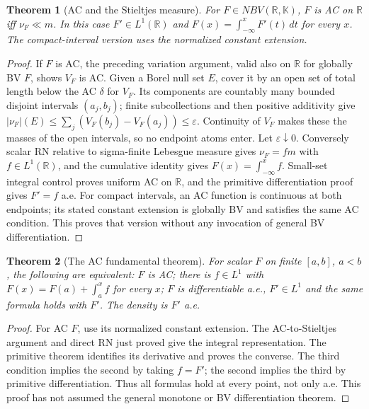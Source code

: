 \documentclass[11pt,oneside,openany]{book}
\newtheorem{theorem}{Theorem}[chapter]
\theoremstyle{definition}
\theoremstyle{remark}
\newcommand{\R}{\mathbb R}\newcommand{\C}{\mathbb C}
\newcommand{\eps}{\varepsilon}\newcommand{\ee}{\varepsilon}
\newcommand{\family}[1]{}
\begin{document}
\begin{theorem}[AC and the Stieltjes measure]\family{D11.12.ac_stieltjes_equivalence}\label{d11:12:ac-stieltjes-equivalence}
For $F\in NBV(\R,\mathbb K)$, $F$ is AC on $\R$ iff
$\nu_F\ll m$. In this case $F'\in L^1(\R)$ and
$F(x)=\int_{-\infty}^xF'(t)\,dt$ for every $x$.
The compact-interval version uses the normalized constant extension.
\end{theorem}
\begin{proof}
If $F$ is AC, the preceding variation argument, valid also on $\R$ for
globally BV $F$, shows $V_F$ is AC. Given a Borel null set $E$, cover it
by an open set of total length below the AC $\delta$ for $V_F$. Its
components are countably many bounded disjoint intervals $(a_j,b_j)$;
finite subcollections and then positive additivity give
$|\nu_F|(E)\leq\sum_j(V_F(b_j)-V_F(a_j))\leq\eps$.
Continuity of $V_F$ makes these the masses of the open intervals, so no
endpoint atoms enter. Let $\eps\downarrow0$.
Conversely scalar RN relative to sigma-finite Lebesgue measure gives
$\nu_F=fm$ with $f\in L^1(\R)$, and the cumulative identity gives
$F(x)=\int_{-\infty}^xf$. Small-set integral control proves uniform AC
on $\R$, and the primitive differentiation proof gives $F'=f$ a.e.
For compact intervals, an AC function is continuous at both endpoints;
its stated constant extension is globally BV and satisfies the same AC
condition. This proves that version without any invocation of general
BV differentiation.
\end{proof}

\begin{theorem}[The AC fundamental theorem]\family{D11.12.ac_ftc}\label{d11:12:ac-ftc}
For scalar $F$ on finite $[a,b]$, $a<b$, the following are equivalent:
$F$ is AC; there is $f\in L^1$ with
$F(x)=F(a)+\int_a^xf$ for every $x$; $F$ is differentiable a.e.,
$F'\in L^1$ and the same formula holds with $F'$. The density is $F'$
a.e.
\end{theorem}
\begin{proof}
For AC $F$, use its normalized constant extension. The AC-to-Stieltjes
argument and direct RN just proved give the integral representation.
The primitive theorem identifies its derivative and proves the converse.
The third condition implies the second by taking $f=F'$; the second
implies the third by primitive differentiation. Thus all formulas hold
at every point, not only a.e. This proof has not assumed the general
monotone or BV differentiation theorem.
\end{proof}
\end{document}
